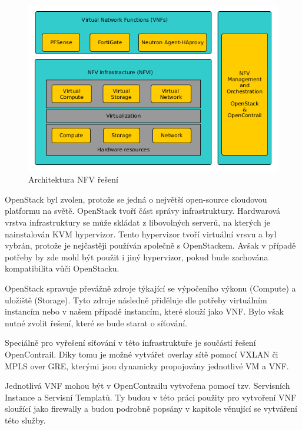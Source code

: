 \begin{figure}[h]
\begin{centering}
\includegraphics[scale=0.51]{images/VNF_overview}
\par\end{centering}
\caption{Architektura NFV řešení\label{fig:VNF_overview}}
\end{figure}

OpenStack byl zvolen, protože se jedná o největší open-source cloudovou platformu na světě. OpenStack tvoří část správy infrastruktury. Hardwarová vrstva infrastruktury se může skládat z libovolných serverů, na kterých je nainstalován KVM hypervizor. Tento hypervizor tvoří virtuální vrsvu a byl vybrán, protože je nejčastěji používán společně s OpenStackem. Avšak v případě potřeby by zde mohl být použit i jiný hypervizor, pokud bude zachována kompatibilita vůči OpenStacku.

OpenStack spravuje převážně zdroje týkající se výpočeního výkonu (Compute) a uložiště (Storage). Tyto zdroje následně přiděluje dle potřeby virtuálním instancím nebo v našem případě instancím, které slouží jako VNF. Bylo však nutné zvolit řešení, které se bude starat o síťování.

Speciálně pro vyřešení síťování v této infrastruktuře je součástí řešení OpenContrail. Díky tomu je možné vytvářet overlay sítě pomocí VXLAN či MPLS over GRE, kterými jsou dynamicky propojovány jednotlivé VM a VNF. 

Jednotlivá VNF mohou být v OpenContrailu vytvořena pomocí tzv. Servisních Instance a Servisní Templatů. Ty budou v této práci použity pro vytvoření VNF sloužící jako firewally a budou podrobně popsány v kapitole věnující se vytváření této služby.

